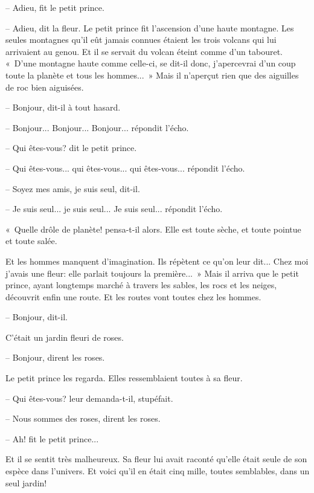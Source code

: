 \documentclass[a4paper]{report}
\begin{document}
-- Adieu, fit le petit prince.

-- Adieu, dit la fleur.
\parachapter[XIX]{} %
Le petit prince fit l'ascension d'une haute montagne. Les seules montagnes qu'il eût jamais connues étaient les trois volcans qui lui arrivaient au genou. Et il se servait du volcan éteint comme d'un tabouret. «~D'une montagne haute comme celle-ci, se dit-il donc, j'apercevrai d'un coup toute la planète et tous les hommes...~» Mais il n'aperçut rien que des aiguilles de roc bien aiguisées.


-- Bonjour, dit-il à tout hasard.

-- Bonjour... Bonjour... Bonjour... répondit l'écho.

-- Qui êtes-vous? dit le petit prince.

-- Qui êtes-vous... qui êtes-vous... qui êtes-vous... répondit l'écho.

-- Soyez mes amis, je suis seul, dit-il.

-- Je suis seul... je suis seul... Je suis seul... répondit l'écho.

«~Quelle drôle de planète! pensa-t-il alors. Elle est toute sèche, et toute pointue et toute salée.

Et les hommes manquent d'imagination. Ils répètent ce qu'on leur dit... Chez moi j'avais une fleur: elle parlait toujours la première...~»
\parachapter[XX]{} %
Mais il arriva que le petit prince, ayant longtemps marché à travers les sables, les rocs et les neiges, découvrit enfin une route. Et les routes vont toutes chez les hommes.

-- Bonjour, dit-il.

C'était un jardin fleuri de roses.

-- Bonjour, dirent les roses.

Le petit prince les regarda. Elles ressemblaient toutes à sa fleur.

-- Qui êtes-vous? leur demanda-t-il, stupéfait.

-- Nous sommes des roses, dirent les roses.

-- Ah! fit le petit prince...

Et il se sentit très malheureux. Sa fleur lui avait raconté qu'elle était seule de son espèce dans l'univers. Et voici qu'il en était cinq mille, toutes semblables, dans un seul jardin!
\end{document}
